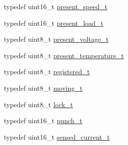 \begin{DoxyCompactItemize}
\item 
typedef uint16\+\_\+t \hyperlink{structdynamixel_1_1servos_1_1_model_traits_3_01_ex106_01_4_1_1_c_t_ab58bdb1dd4fbab1f4d71168e558751f3}{present\+\_\+speed\+\_\+t}
\item 
typedef uint16\+\_\+t \hyperlink{structdynamixel_1_1servos_1_1_model_traits_3_01_ex106_01_4_1_1_c_t_a7c13ab291d712ea51a36346513ea0571}{present\+\_\+load\+\_\+t}
\item 
typedef uint8\+\_\+t \hyperlink{structdynamixel_1_1servos_1_1_model_traits_3_01_ex106_01_4_1_1_c_t_a64426a929b4b57b64b7a1b0f010c00f7}{present\+\_\+voltage\+\_\+t}
\item 
typedef uint8\+\_\+t \hyperlink{structdynamixel_1_1servos_1_1_model_traits_3_01_ex106_01_4_1_1_c_t_ad8442b12bd4f3eda547fe1249afdc14e}{present\+\_\+temperature\+\_\+t}
\item 
typedef uint8\+\_\+t \hyperlink{structdynamixel_1_1servos_1_1_model_traits_3_01_ex106_01_4_1_1_c_t_ac0000e798cc34a716ebabc3ca0229d03}{registered\+\_\+t}
\item 
typedef uint8\+\_\+t \hyperlink{structdynamixel_1_1servos_1_1_model_traits_3_01_ex106_01_4_1_1_c_t_a2cd9e1d517c7682284d0243bbc3bdfbb}{moving\+\_\+t}
\item 
typedef uint8\+\_\+t \hyperlink{structdynamixel_1_1servos_1_1_model_traits_3_01_ex106_01_4_1_1_c_t_a462acc540698555c54791b3845c7a554}{lock\+\_\+t}
\item 
typedef uint16\+\_\+t \hyperlink{structdynamixel_1_1servos_1_1_model_traits_3_01_ex106_01_4_1_1_c_t_a9948543ba670d97a077210d4263e802d}{punch\+\_\+t}
\item 
typedef uint16\+\_\+t \hyperlink{structdynamixel_1_1servos_1_1_model_traits_3_01_ex106_01_4_1_1_c_t_ab465d59768fbf996f534ac99a418a0c7}{sensed\+\_\+current\+\_\+t}
\end{DoxyCompactItemize}
